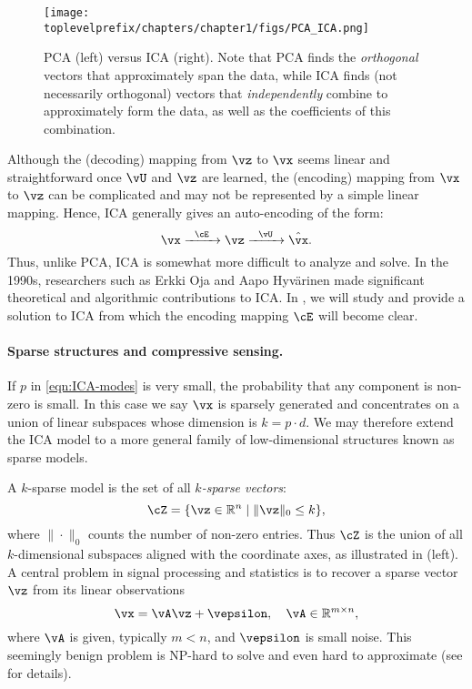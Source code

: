 \documentclass[../../book-main.tex]{subfiles}
\begin{document}
\begin{figure}
    \centering
    \texttt{[image: \\toplevelprefix/chapters/chapter1/figs/PCA\_ICA.png]}
    \caption{PCA (left) versus ICA (right). Note that PCA finds the \textit{orthogonal} vectors that approximately span the data, while ICA finds (not necessarily orthogonal) vectors that \textit{independently} combine to approximately form the data, as well as the coefficients of this combination.}
    \label{fig:ICA-PCA}
\end{figure}

Although the (decoding) mapping from \(\vz\) to \(\vx\) seems linear and straightforward once \(\vU\) and \(\vz\) are learned, the (encoding) mapping from \(\vx\) to \(\vz\) can be complicated and may not be represented by a simple linear mapping. Hence, ICA generally gives an auto-encoding of the form:
\begin{equation}
    \vx   \xrightarrow{\hspace{2mm} \cE\hspace{2mm}} \vz  \xrightarrow{\hspace{2mm} \vU \hspace{2mm}} \hat{\vx}.
       \label{eqn:auto-encoding-ICA}
\end{equation}
Thus, unlike PCA, ICA is somewhat more difficult to analyze and solve. In the 1990s, researchers such as Erkki Oja and Aapo Hyv\"{a}rinen \cite{hyvarinen-1997,Hyvrinen-2000} made significant theoretical and algorithmic contributions to ICA. In , we will study and provide a solution to ICA from which the encoding mapping \(\cE\) will become clear.


\paragraph{Sparse structures and compressive sensing.}
If \(p\) in \eqref{eqn:ICA-modes} is very small, the probability that any component is non-zero is small. In this case we say \(\vx\) is sparsely generated and concentrates on a union of linear subspaces whose dimension is \(k = p \cdot d\). We may therefore extend the ICA model to a more general family of low-dimensional structures known as sparse models.

A \(k\)-sparse model is the set of all \textit{\(k\)-sparse vectors}:
\begin{equation}
    \cZ = \{\vz \in \R^{n} \mid \|\vz\|_{0} \le k\},
\end{equation}
where \(\|\cdot\|_{0}\) counts the number of non-zero entries. Thus \(\cZ\) is the union of all \(k\)-dimensional subspaces aligned with the coordinate axes, as illustrated in  (left). A central problem in signal processing and statistics is to recover a sparse vector \(\vz\) from its linear observations
\begin{equation}
    \vx = \vA \vz + \vepsilon, \quad \vA \in \R^{m\times n},
    \label{eqn:sparse-model}
\end{equation}
where \(\vA\) is given, typically \(m < n\), and \(\vepsilon\) is small noise. This seemingly benign problem is NP-hard to solve and even hard to approximate (see \cite{Wright-Ma-2022} for details).
\end{document}
